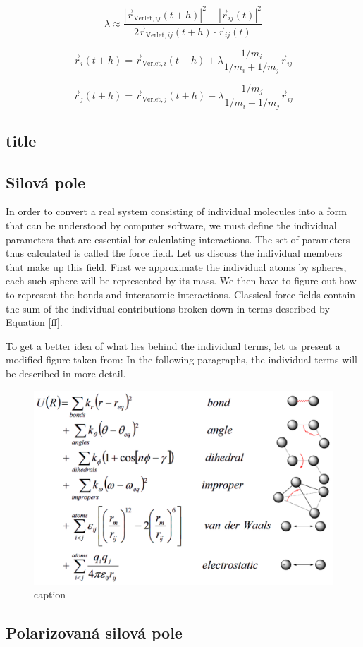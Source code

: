 \begin{equation}\label{SHAKE_lamda}
	\lambda \approx \frac{|\vec{r}_{\text{Verlet},ij}(t + h)|^2 - |\vec{r}_{ij}(t)|^2}
	{2\vec{r}_{\text{Verlet},ij}(t + h) \cdot \vec{r}_{ij}(t)}
\end{equation}

\begin{equation}\label{SHAKE_lamdai}
	\vec{r}_i(t + h) = \vec{r}_{\text{Verlet},i}(t + h) + \lambda \frac{1/m_i}{ 1/m_i + 1/m_j} \vec{r}_{ij}
\end{equation}

\begin{equation}\label{SHAKE_lamdaj}
	\vec{r}_j(t + h) = \vec{r}_{\text{Verlet},j}(t + h) - \lambda \frac{1/m_j}{ 1/m_i + 1/m_j} \vec{r}_{ij}
\end{equation}

\subsection{title}
\subsection{Silová pole}

In order to convert a real system consisting of individual molecules into a form that can be understood by computer software, we must define the individual parameters that are essential for calculating interactions. The set of parameters thus calculated is called the force field. Let us discuss the individual members that make up this field. First we approximate the individual atoms by spheres, each such sphere will be represented by its mass. We then have to figure out how to represent the bonds and interatomic interactions. Classical force fields contain the sum of the individual contributions broken down in terms described by Equation \ref{ff}.

To get a better idea of what lies behind the individual terms, let us present a modified figure taken from:  In the following paragraphs, the individual terms will be described in more detail.

\begin{figure}[htb!]
	\centering
	\includegraphics[width=1.0\linewidth]{img/ff.png} 
	\caption{caption}
	\label{fig:ff}    
\end{figure}  




\subsection{Polarizovaná silová pole}